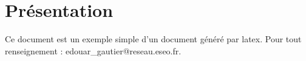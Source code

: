 \section{Présentation}
Ce document est un exemple simple d'un document généré par \gls{latex}. \newline
Pour tout renseignement : edouar\_gautier@reseau.eseo.fr.
